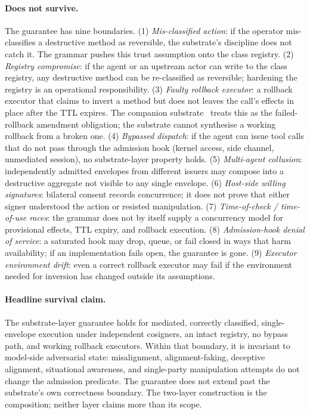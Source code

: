 \paragraph{Does not survive.}
The guarantee has nine boundaries. (1) \emph{Mis-classified action}: if the operator mis-classifies a destructive method as reversible, the substrate's discipline does not catch it. The grammar pushes this trust assumption onto the class registry. (2) \emph{Registry compromise}: if the agent or an upstream actor can write to the class registry, any destructive method can be re-classified as reversible; hardening the registry is an operational responsibility. (3) \emph{Faulty rollback executor}: a rollback executor that claims to invert a method but does not leaves the call's effects in place after the TTL expires. The companion substrate~\cite{programmableSovereignty2026} treats this as the failed-rollback amendment obligation; the substrate cannot synthesise a working rollback from a broken one. (4) \emph{Bypassed dispatch}: if the agent can issue tool calls that do not pass through the admission hook (kernel access, side channel, unmediated session), no substrate-layer property holds. (5) \emph{Multi-agent collusion}: independently admitted envelopes from different issuers may compose into a destructive aggregate not visible to any single envelope. (6) \emph{Host-side willing signatures}: bilateral consent records concurrence; it does not prove that either signer understood the action or resisted manipulation. (7) \emph{Time-of-check / time-of-use races}: the grammar does not by itself supply a concurrency model for provisional effects, TTL expiry, and rollback execution. (8) \emph{Admission-hook denial of service}: a saturated hook may drop, queue, or fail closed in ways that harm availability; if an implementation fails open, the guarantee is gone. (9) \emph{Executor environment drift}: even a correct rollback executor may fail if the environment needed for inversion has changed outside its assumptions.

\paragraph{Headline survival claim.}
The substrate-layer guarantee holds for mediated, correctly classified, single-envelope execution under independent cosigners, an intact registry, no bypass path, and working rollback executors. Within that boundary, it is invariant to model-side adversarial state: misalignment, alignment-faking, deceptive alignment, situational awareness, and single-party manipulation attempts do not change the admission predicate. The guarantee does not extend past the substrate's own correctness boundary. The two-layer construction is the composition; neither layer claims more than its scope.
